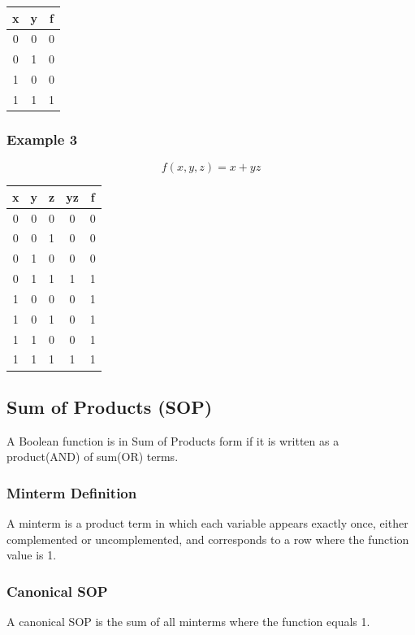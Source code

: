 \begin{center}
\begin{tabular}{|c|c|c|}
\hline
x & y & f \\
\hline
0 & 0 & 0 \\
0 & 1 & 0 \\
1 & 0 & 0 \\
1 & 1 & 1 \\
\hline
\end{tabular}
\end{center}

\subsubsection*{Example 3}
\[
f(x,y,z) = x + yz
\]

\begin{center}
\begin{tabular}{|c|c|c|c|c|}
\hline
x & y & z & yz & f \\
\hline
0 & 0 & 0 & 0 & 0 \\
0 & 0 & 1 & 0 & 0 \\
0 & 1 & 0 & 0 & 0 \\
0 & 1 & 1 & 1 & 1 \\
1 & 0 & 0 & 0 & 1 \\
1 & 0 & 1 & 0 & 1 \\
1 & 1 & 0 & 0 & 1 \\
1 & 1 & 1 & 1 & 1 \\
\hline
\end{tabular}
\end{center}

\subsection{Sum of Products (SOP)}

A Boolean function is in Sum of Products form if it is written as a product(AND) of sum(OR) terms.

\subsubsection*{Minterm Definition}
A minterm is a product term in which each variable appears exactly once, either complemented or uncomplemented, and corresponds to a row where the function value is 1.

\subsubsection*{Canonical SOP}
A canonical SOP is the sum of all minterms where the function equals 1.

